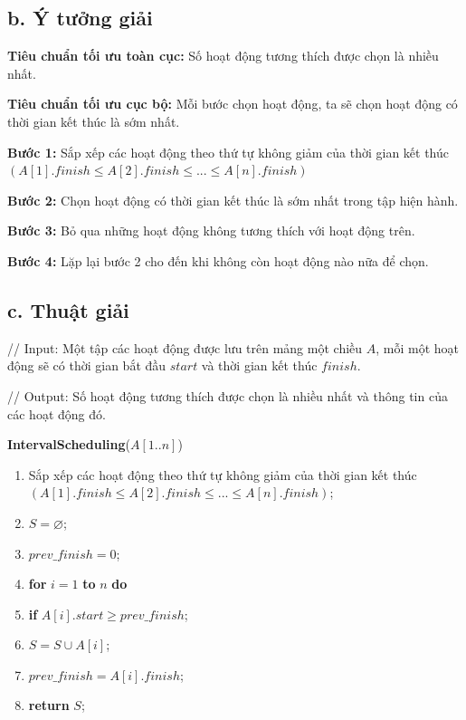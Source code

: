 \documentclass[12pt, a4paper, fleqn]{article}
\begin{document}
	\subsection*{b. Ý tưởng giải}
	
	\textbf{Tiêu chuẩn tối ưu toàn cục:} Số hoạt động tương thích được chọn là nhiều nhất.
	
	\textbf{Tiêu chuẩn tối ưu cục bộ:} Mỗi bước chọn hoạt động, ta sẽ chọn hoạt động có thời gian kết thúc là sớm nhất.
	
	\textbf{Bước 1:} Sắp xếp các hoạt động theo thứ tự không giảm của thời gian kết thúc $(A[1].finish \leq A[2].finish \leq ... \leq A[n].finish)$
	
	\textbf{Bước 2:} Chọn hoạt động có thời gian kết thúc là sớm nhất trong tập hiện hành.
	
	\textbf{Bước 3:} Bỏ qua những hoạt động không tương thích với hoạt động trên.
	
	\textbf{Bước 4:} Lặp lại bước 2 cho đến khi không còn hoạt động nào nữa để chọn.

	
	\subsection*{c. Thuật giải}
	
		// Input: Một tập các hoạt động được lưu trên mảng một chiều $A$, mỗi một hoạt động sẽ có thời gian bắt đầu $start$ và thời gian kết thúc $finish$.
		
		// Output: Số hoạt động tương thích được chọn là nhiều nhất và thông tin của các hoạt động đó.
		
		\clearpage
	
		\textbf{IntervalScheduling}($A[1..n]$)
		\begin{enumerate}
			\item Sắp xếp các hoạt động theo thứ tự không giảm của thời gian kết thúc $(A[1].finish \leq A[2].finish \leq ... \leq A[n].finish)$;
			\item $S = \varnothing$;
			\item $prev\_finish = 0$;
			\item \textbf{for} $i = 1$ \textbf{to} $n$ \textbf{do}
			\item \qquad \textbf{if} $A[i].start \geq prev\_finish$;
			\item \qquad \qquad $S = S \cup A[i]$;
			\item \qquad \qquad $prev\_finish = A[i].finish$;
			\item \textbf{return} $S$;
		\end{enumerate}
	
\end{document}
